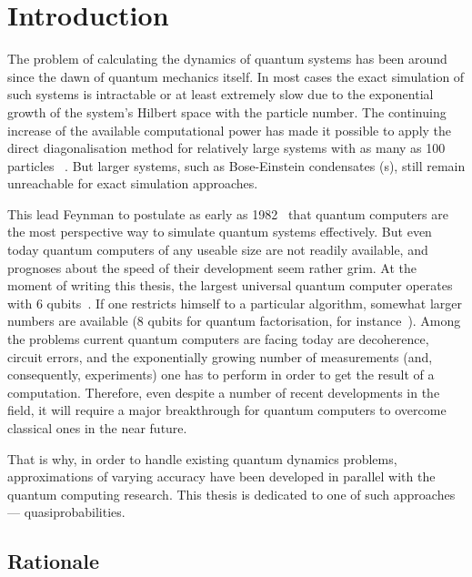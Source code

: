 \chapter{Introduction}

The problem of calculating the dynamics of quantum systems has been around since the dawn of quantum mechanics itself.
In most cases the exact simulation of such systems is intractable or at least extremely slow due to the exponential growth of the system's Hilbert space with the particle number.
The continuing increase of the available computational power has made it possible to apply the direct diagonalisation method for relatively large systems with as many as 100 particles~\cite{Sakmann2009} .
But larger systems, such as Bose-Einstein condensates (s), still remain unreachable for exact simulation approaches.

This lead Feynman to postulate as early as 1982~\cite{Feynman1982} that quantum computers are the most perspective way to simulate quantum systems effectively.
But even today quantum computers of any useable size are not readily available, and prognoses about the speed of their development seem rather grim.
At the moment of writing this thesis, the largest universal quantum computer operates with 6 qubits~\cite{Lanyon2011}.
If one restricts himself to a particular algorithm, somewhat larger numbers are available (8 qubits for quantum factorisation, for instance~\cite{Xu2012}).
Among the problems current quantum computers are facing today are decoherence, circuit errors, and the exponentially growing number of measurements (and, consequently, experiments) one has to perform in order to get the result of a computation.
Therefore, even despite a number of recent developments in the field, it will require a major breakthrough for quantum computers to overcome classical ones in the near future.

That is why, in order to handle existing quantum dynamics problems, approximations of varying accuracy have been developed in parallel with the quantum computing research.
This thesis is dedicated to one of such approaches --- quasiprobabilities.

\section{Rationale}

